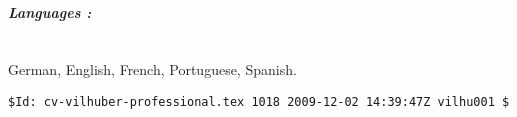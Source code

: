 \documentclass[10pt,letterpaper]{report}
\begin{document}
\paragraph{\it \bf Languages :}
\ \\
German, English, French, Portuguese, Spanish. 


{\tiny
\begin{verbatim}
$Id: cv-vilhuber-professional.tex 1018 2009-12-02 14:39:47Z vilhu001 $
\end{verbatim}
}

 
\end{document}
